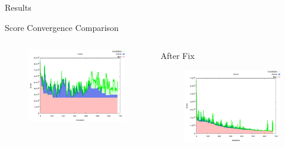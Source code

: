 \documentclass[aspectratio=169]{beamer}
\begin{document}
\begin{frame}[label={sec:org4ee59dd}]{Results}
\begin{frame}[label={sec:org1702709}]{Score Convergence Comparison}
\begin{columns}
\begin{column}{0.5\columnwidth}
\begin{figure}[htpb]
\centering
    \includegraphics[width=\textwidth]{img/score-diverge}
\end{figure}
\end{column}

\begin{column}{0.5\columnwidth}
\begin{center}
After Fix
\end{center}

\begin{figure}[htpb]
\centering
    \includegraphics[width=\textwidth]{img/score-convergence}
\end{figure}
\end{column}
\end{columns}
\end{frame}


\end{frame}
\end{document}
